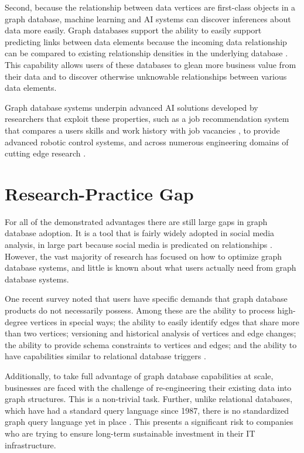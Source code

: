 Second, because the relationship between data vertices are first-class objects in a graph database, machine learning and AI systems can discover inferences about data more easily. Graph databases support the ability to easily support predicting links between data elements because the incoming data relationship can be compared to existing relationship densities in the underlying database \parencite{karunarathnaScalableGraphConvolutional2020,wangLinkPredictionHeterogeneous2021}. This capability allows users of these databases to glean more business value from their data and to discover otherwise unknowable relationships between various data elements.

Graph database systems underpin advanced AI solutions developed by researchers that exploit these properties, such as a job recommendation system that compares a users skills and work history with job vacancies \parencite{giabelliSkills2JobRecommenderSystem2021}, to provide advanced robotic control systems, and across numerous engineering domains of cutting edge research \parencite{bhattacharyyaGraphDatabaseSurvey2020}.

\section{Research-Practice Gap}

For all of the demonstrated advantages there are still large gaps in graph database adoption. It is a tool that is fairly widely adopted in social media analysis, in large part because social media is predicated on relationships \parencite{borahImprovisedMarketingInterventions2020,changSocialMediaInfluencer2020,guoFutureFalseInformation2020}. However, the vast majority of research has focused on how to optimize graph database systems, and little is known about what users actually need from graph database systems.

One recent survey noted that users have specific demands that graph database products do not necessarily possess. Among these are the ability to process high-degree vertices in special ways; the ability to easily identify edges that share more than two vertices; versioning and historical analysis of vertices and edge changes; the ability to provide schema constraints to vertices and edges; and the ability to have capabilities similar to relational database triggers \parencite{sahuUbiquityLargeGraphs2020}.

Additionally, to take full advantage of graph database capabilities at scale, businesses are faced with the challenge of re-engineering their existing data into graph structures. This is a non-trivial task. Further, unlike relational databases, which have had a standard query language since 1987, there is no standardized graph query language yet in place \parencite{bhattacharyyaGraphDatabaseSurvey2020}. This presents a significant risk to companies who are trying to ensure long-term sustainable investment in their IT infrastructure.


